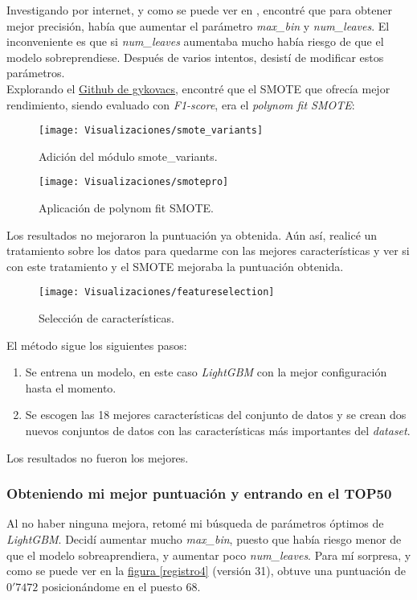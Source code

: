 \documentclass[paper=a4, fontsize=12pt]{article} %
\numberwithin{equation}{section} %
\numberwithin{figure}{section} %
\numberwithin{table}{section} %
\begin{document}
Investigando por internet, y como se puede ver en \cite{tuning}, encontré que para obtener mejor precisión, había que aumentar el parámetro \textit{max\_bin} y \textit{num\_leaves}. El inconveniente es que si \textit{num\_leaves} aumentaba mucho había riesgo de que el modelo sobreprendiese. Después de varios intentos, desistí de modificar estos parámetros. \\

Explorando el \href{https://github.com/gykovacs/smote_variants}{Github de gykovacs}, encontré que el SMOTE que ofrecía mejor rendimiento, siendo evaluado con \textit{F1-score}, era el \textit{polynom fit SMOTE}:


\begin{figure}[H]
  \centering
  \texttt{[image: Visualizaciones/smote\_variants]}
  \caption{Adición del módulo smote\_variants.}
  \label{smote_variants}
\end{figure}


\begin{figure}[H]
  \centering
  \texttt{[image: Visualizaciones/smotepro]}
  \caption{Aplicación de polynom fit SMOTE.}
  \label{smotepro}
\end{figure}

Los resultados no mejoraron la puntuación ya obtenida. Aún así, realicé un tratamiento sobre los datos para quedarme con las mejores características y ver si con este tratamiento y el SMOTE mejoraba la puntuación obtenida.

\begin{figure}[H]
  \centering
  \texttt{[image: Visualizaciones/featureselection]}
  \caption{Selección de características.}
  \label{feature}
\end{figure}

El método sigue los siguientes pasos:

\begin{enumerate}
\item Se entrena un modelo, en este caso \textit{LightGBM} con la mejor configuración hasta el momento.
\item Se escogen las 18 mejores características del conjunto de datos y se crean dos nuevos conjuntos de datos con las características más importantes del \textit{dataset}.
\end{enumerate}

Los resultados no fueron los mejores. \\

\subsubsection{Obteniendo mi mejor puntuación y entrando en el TOP50}
Al no haber ninguna mejora, retomé mi búsqueda de parámetros óptimos de \textit{LightGBM}. Decidí aumentar mucho \textit{max\_bin}, puesto que había riesgo menor de que el modelo sobreaprendiera, y aumentar poco \textit{num\_leaves}. Para mí sorpresa, y como se puede ver en la \hyperref[registro4]{figura \ref*{registro4}} (versión 31), obtuve una puntuación de $0'7472$ posicionándome en el puesto 68.\\
\end{document}
